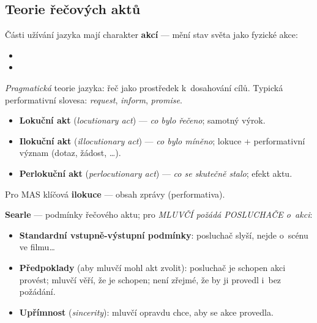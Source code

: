 \documentclass[11pt,a4paper]{article}
\theoremstyle{definition}
\begin{document}
\subsection{Teorie řečových aktů}

\begin{defbox}
Části užívání jazyka mají charakter \textbf{akcí} --- mění stav světa jako fyzické akce:
\begin{itemize}
\item {}
\item {}
\end{itemize}
\emph{Pragmatická} teorie jazyka: řeč jako prostředek k~dosahování cílů.
Typická performativní slovesa: \emph{request}, \emph{inform}, \emph{promise}.
\end{defbox}

\begin{defbox}
\begin{itemize}
\item \textbf{Lokuční akt} (\emph{locutionary act}) --- \emph{co bylo řečeno}; samotný výrok.
\item \textbf{Ilokuční akt} (\emph{illocutionary act}) --- \emph{co bylo míněno};
  lokuce + performativní význam (dotaz, žádost, \dots). 
\item \textbf{Perlokuční akt} (\emph{perlocutionary act}) --- \emph{co se skutečně stalo};
  efekt aktu. 
\end{itemize}
Pro MAS klíčová \textbf{ilokuce} --- obsah zprávy (performativa).
\end{defbox}

\textbf{Searle} --- podmínky  řečového aktu; pro \emph{MLUVČÍ požádá
POSLUCHAČE o~akci}:
\begin{itemize}
\item \textbf{Standardní vstupně-výstupní podmínky}: posluchač slyší, nejde o~scénu ve filmu\dots
\item \textbf{Předpoklady} (aby mluvčí mohl akt zvolit): posluchač je schopen akci provést;
  mluvčí věří, že je schopen; není zřejmé, že by ji provedl i~bez požádání.
\item \textbf{Upřímnost} (\emph{sincerity}): mluvčí opravdu chce, aby se akce provedla.
\end{itemize}
\end{document}
